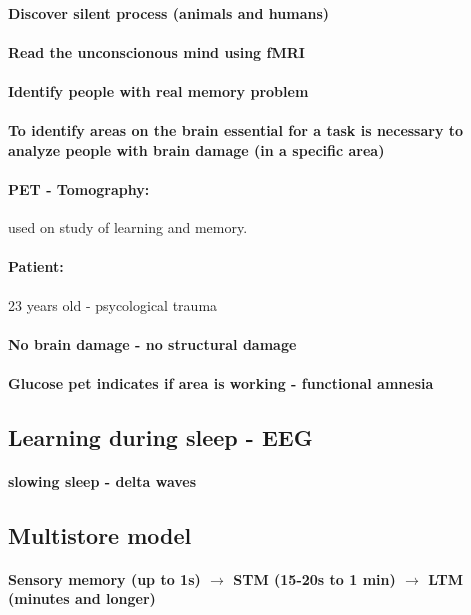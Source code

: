 \documentclass[12pt,article,oneside,a4paper]{memoir}
\begin{document}
\paragraph{Discover silent process (animals and humans)}
\paragraph{Read the unconscionous mind using fMRI}
\paragraph{Identify people with real memory problem}

\paragraph{To identify areas on the brain essential for a task is necessary to analyze people with brain damage (in a specific area)}

\paragraph{PET - Tomography:} used on study of learning and memory.
\paragraph{Patient:} 23 years old - psycological trauma
\paragraph{No brain damage - no structural damage}
\paragraph{Glucose pet indicates if area is working - functional amnesia}

\subsection{Learning during sleep - EEG}
\paragraph{slowing sleep - delta waves}

\subsection{Multistore model}
\paragraph{Sensory memory (up to 1s) $\rightarrow$ STM (15-20s to 1 min) $\rightarrow$ LTM (minutes and longer)}
\end{document}
